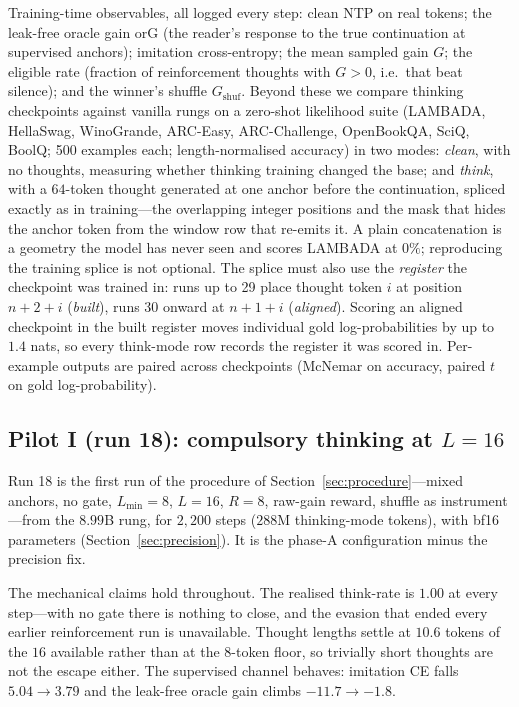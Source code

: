 \documentclass{article} %
\newcommand{\gain}{G}
\begin{document}
Training-time observables, all logged every step: clean NTP on real tokens; the leak-free oracle gain $\mathrm{orG}$ (the reader's response to the true continuation at supervised anchors); imitation cross-entropy; the mean sampled gain $\gain$; the eligible rate (fraction of reinforcement thoughts with $\gain > 0$, i.e.\ that beat silence); and the winner's shuffle $\gain_{\mathrm{shuf}}$. Beyond these we compare thinking checkpoints against vanilla rungs on a zero-shot likelihood suite (LAMBADA, HellaSwag, WinoGrande, ARC-Easy, ARC-Challenge, OpenBookQA, SciQ, BoolQ; 500 examples each; length-normalised accuracy) in two modes: \emph{clean}, with no thoughts, measuring whether thinking training changed the base; and \emph{think}, with a $64$-token thought generated at one anchor before the continuation, spliced exactly as in training---the overlapping integer positions and the mask that hides the anchor token from the window row that re-emits it. A plain concatenation is a geometry the model has never seen and scores LAMBADA at $0\%$; reproducing the training splice is not optional. The splice must also use the \emph{register} the checkpoint was trained in: runs up to 29 place thought token $i$ at position $n{+}2{+}i$ (\emph{built}), runs 30 onward at $n{+}1{+}i$ (\emph{aligned}). Scoring an aligned checkpoint in the built register moves individual gold log-probabilities by up to $1.4$ nats, so every think-mode row records the register it was scored in. Per-example outputs are paired across checkpoints (McNemar on accuracy, paired $t$ on gold log-probability).

\subsection{Pilot I (run 18): compulsory thinking at $L{=}16$}
\label{sec:run18}

Run 18 is the first run of the procedure of Section~\ref{sec:procedure}---mixed anchors, no gate, $L_{\min}{=}8$, $L{=}16$, $R{=}8$, raw-gain reward, shuffle as instrument---from the $8.99$B rung, for $2{,}200$ steps ($288$M thinking-mode tokens), with bf16 parameters (Section~\ref{sec:precision}). It is the phase-A configuration minus the precision fix.

The mechanical claims hold throughout. The realised think-rate is $1.00$ at every step---with no gate there is nothing to close, and the evasion that ended every earlier reinforcement run is unavailable. Thought lengths settle at $10.6$ tokens of the $16$ available rather than at the $8$-token floor, so trivially short thoughts are not the escape either. The supervised channel behaves: imitation CE falls $5.04 \to 3.79$ and the leak-free oracle gain climbs $-11.7 \to -1.8$.
\end{document}
